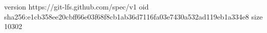 version https://git-lfs.github.com/spec/v1
oid sha256:e1cb358ee20cbff66e03f68f8cb1ab36d7116fa03e7430a532ad119eb1a334e8
size 10302
